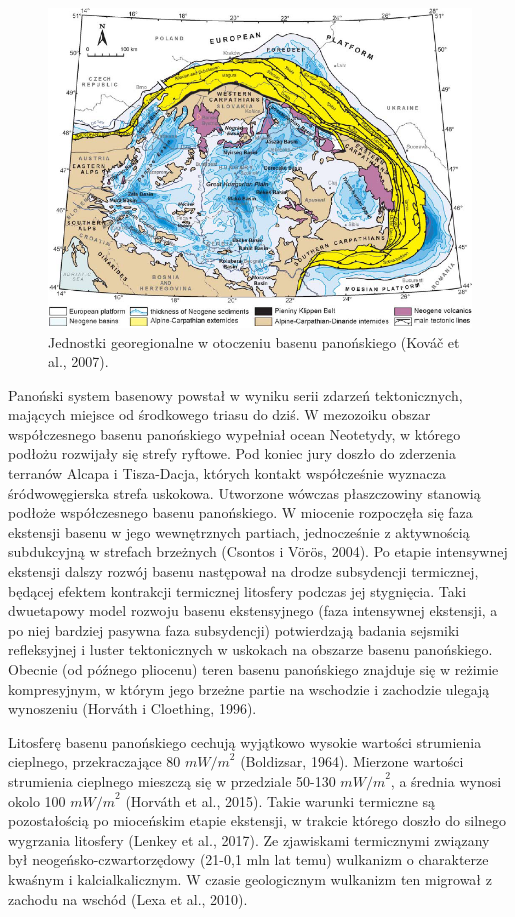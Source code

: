 \documentclass[11.5pt,twoside]{report}
\begin{document}
\begin{figure}[h]
	\centering
	\includegraphics[scale=0.7]{"../Termika/kovac et al"}
	\caption{Jednostki georegionalne w otoczeniu basenu panońskiego (Kováč et al., 2007).}
	\label{Fig.}
\end{figure}

Panoński system basenowy powstał w wyniku serii zdarzeń tektonicznych, mających miejsce od środkowego triasu do dziś. W mezozoiku obszar współczesnego basenu panońskiego wypełniał ocean Neotetydy, w którego podłożu rozwijały się strefy ryftowe. Pod koniec jury doszło do zderzenia terranów Alcapa i Tisza-Dacja, których kontakt współcześnie wyznacza śródwowęgierska strefa uskokowa. Utworzone wówczas płaszczowiny stanowią podłoże współczesnego basenu panońskiego. W miocenie rozpoczęła się faza ekstensji basenu w jego wewnętrznych partiach, jednocześnie z aktywnością subdukcyjną w strefach brzeżnych (Csontos i V\"{o}r\"{o}s, 2004). Po etapie intensywnej ekstensji dalszy rozwój basenu następował na drodze subsydencji termicznej, będącej efektem kontrakcji termicznej litosfery podczas jej stygnięcia. Taki dwuetapowy model rozwoju basenu ekstensyjnego (faza intensywnej ekstensji, a po niej bardziej pasywna faza subsydencji) potwierdzają badania sejsmiki refleksyjnej i luster tektonicznych w uskokach na obszarze basenu panońskiego. Obecnie (od pó\'{z}nego pliocenu) teren basenu panońskiego znajduje się w reżimie kompresyjnym, w którym jego brzeżne partie na wschodzie i zachodzie ulegają wynoszeniu (Horv\'{a}th i Cloething, 1996). 

Litosferę basenu panońskiego cechują wyjątkowo wysokie wartości strumienia cieplnego, przekraczające 80 ${mW/m}^{2}$ (Boldizsar, 1964). Mierzone wartości strumienia cieplnego mieszczą się w przedziale 50-130 ${mW/m}^{2}$, a średnia wynosi okolo 100 ${mW/m}^{2}$ (Horv\'{a}th et al., 2015). Takie warunki termiczne są pozostałością po mioceńskim etapie ekstensji, w trakcie którego doszło do silnego wygrzania litosfery (Lenkey et al., 2017). Ze zjawiskami termicznymi związany był neogeńsko-czwartorzędowy (21-0,1 mln lat temu) wulkanizm o charakterze kwaśnym i kalcialkalicznym. W czasie geologicznym wulkanizm ten migrował z zachodu na wschód (Lexa et al., 2010). 
\end{document}
